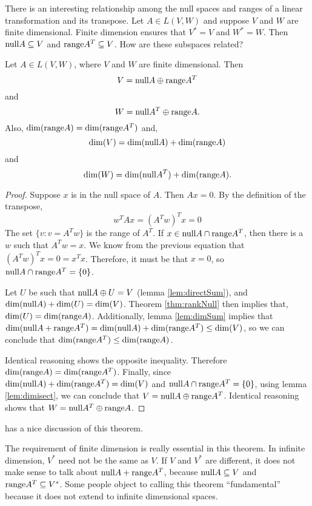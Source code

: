 There is an interesting relationship among the null spaces and ranges
of a linear transformation and its transpose. Let $A \in L(V,W)$ and
suppose $V$ and $W$ are finite dimensional. Finite dimension ensures
that $V^\ast = V$ and $W^\ast = W$. Then $\mathrm{null} A
\subseteq V$ and $\mathrm{range} A^T \subseteq V$. How are these
subspaces related?  
\begin{theorem}\label{thm:fund}
  Let $A \in L(V,W)$, where $V$ and $W$ are finite dimensional. Then 
  \[ V = \mathrm{null} A \oplus \mathrm{range} A^T \]
  and 
  \[ W = \mathrm{null} A^T \oplus \mathrm{range} A. \] 
  Also, $\mathrm{dim}(\mathrm{range} A) = \mathrm{dim}(\mathrm{range}  A^T)$ and,
  \[ \mathrm{dim}(V) = \mathrm{dim}(\mathrm{null} A) + \mathrm{dim}(\mathrm{range} A) \]
  and 
  \[ \mathrm{dim}(W) = \mathrm{dim}(\mathrm{null} A^T) + \mathrm{dim}(\mathrm{range} A). \]
\end{theorem}
\begin{proof}
  Suppose $x$ is in the null space of $A$. Then $A x
  = 0$. By the definition of the transpose,
  \[ w^T A x = (A^T w)^T x = 0 \]
  The set $\{v : v = A^T w\}$ is the range of $A^T$. If $x \in
  \mathrm{null} A \cap \mathrm{range} A^T$, then there is a $w$ such that
  $A^T w = x$. We know from the previous equation that $(A^T w)^T x = 0
  = x^T x$. Therefore, it must be that $x=0$, so $\mathrm{null} A \cap
  \mathrm{range} A^T = \{ 0 \}$. 
  
  Let $U$ be such that $\mathrm{null} A \oplus U = V$ (lemma
  \ref{lem:directSum}), and $\mathrm{dim}(\mathrm{null} A) + \mathrm{dim}(U) =
  \mathrm{dim}(V)$. Theorem \ref{thm:rankNull} then implies that, 
  $\mathrm{dim}(U) = \mathrm{dim}(\mathrm{range} A)$. Additionally, lemma \ref{lem:dimSum}
  implies that $\mathrm{dim}(\mathrm{null} A + \mathrm{range} A^T) = \mathrm{dim}(\mathrm{null} A) +
  \mathrm{dim}(\mathrm{range} A^T) \leq \mathrm{dim} (V)$, so we can conclude that
  $\mathrm{dim}(\mathrm{range} A^T) \leq \mathrm{dim}(\mathrm{range} A)$.
  
  Identical reasoning shows the opposite inequality. Therefore
  $\mathrm{dim}(\mathrm{range} A) = \mathrm{dim}(\mathrm{range} A^T)$. Finally, since
  $\mathrm{dim}(\mathrm{null} A) + \mathrm{dim}(\mathrm{range} A^T) = \mathrm{dim}(V)$ and 
  $\mathrm{null} A \cap \mathrm{range} A^T = \{ 0 \}$, using lemma
  \ref{lem:dimisect}, we can conclude that
  $V = \mathrm{null} A \oplus \mathrm{range} A^T$. 
  Identical reasoning shows that $W = \mathrm{null} A^T \oplus \mathrm{range} A$. 
\end{proof}
\cite{strang1993} has a nice discussion of this theorem. 

The requirement of finite dimension is really essential in this
theorem. In infinite dimension, $V^\ast$ need not be the same as
$V$. If $V$ and $V^\ast$ are different, it does not make sense to talk
about $\mathrm{null} A + \mathrm{range} A^T$, because $\mathrm{null} A \subseteq V$ and
$\mathrm{range} A^T \subseteq V^\ast$. Some people object to calling this
theorem ``fundamental'' because it does not extend to infinite
dimensional spaces. 

